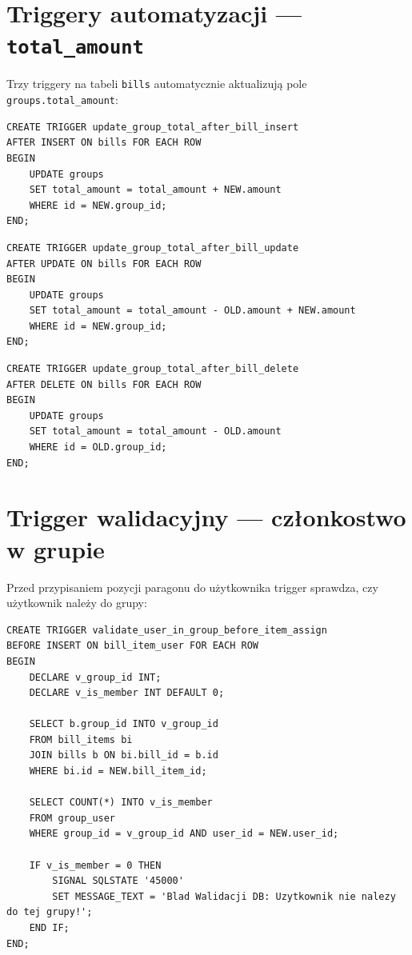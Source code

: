 \documentclass[12pt,a4paper]{report}
\begin{document}
\section{Triggery automatyzacji --- \texttt{total\_amount}}

Trzy triggery na tabeli \texttt{bills} automatycznie aktualizuj\k{a} pole \texttt{groups.total\_amount}:

\begin{lstlisting}[style=sqlstyle, caption={Trigger po INSERT na bills}]
CREATE TRIGGER update_group_total_after_bill_insert
AFTER INSERT ON bills FOR EACH ROW
BEGIN
    UPDATE groups
    SET total_amount = total_amount + NEW.amount
    WHERE id = NEW.group_id;
END;
\end{lstlisting}

\begin{lstlisting}[style=sqlstyle, caption={Trigger po UPDATE na bills}]
CREATE TRIGGER update_group_total_after_bill_update
AFTER UPDATE ON bills FOR EACH ROW
BEGIN
    UPDATE groups
    SET total_amount = total_amount - OLD.amount + NEW.amount
    WHERE id = NEW.group_id;
END;
\end{lstlisting}

\begin{lstlisting}[style=sqlstyle, caption={Trigger po DELETE na bills}]
CREATE TRIGGER update_group_total_after_bill_delete
AFTER DELETE ON bills FOR EACH ROW
BEGIN
    UPDATE groups
    SET total_amount = total_amount - OLD.amount
    WHERE id = OLD.group_id;
END;
\end{lstlisting}

\section{Trigger walidacyjny --- cz\l{}onkostwo w grupie}

Przed przypisaniem pozycji paragonu do u\.zytkownika trigger sprawdza, czy u\.zytkownik nale\.zy do grupy:

\begin{lstlisting}[style=sqlstyle, caption={Walidacja przy INSERT na bill\_item\_user}]
CREATE TRIGGER validate_user_in_group_before_item_assign
BEFORE INSERT ON bill_item_user FOR EACH ROW
BEGIN
    DECLARE v_group_id INT;
    DECLARE v_is_member INT DEFAULT 0;

    SELECT b.group_id INTO v_group_id
    FROM bill_items bi
    JOIN bills b ON bi.bill_id = b.id
    WHERE bi.id = NEW.bill_item_id;

    SELECT COUNT(*) INTO v_is_member
    FROM group_user
    WHERE group_id = v_group_id AND user_id = NEW.user_id;

    IF v_is_member = 0 THEN
        SIGNAL SQLSTATE '45000'
        SET MESSAGE_TEXT = 'Blad Walidacji DB: Uzytkownik nie nalezy do tej grupy!';
    END IF;
END;
\end{lstlisting}
\end{document}
